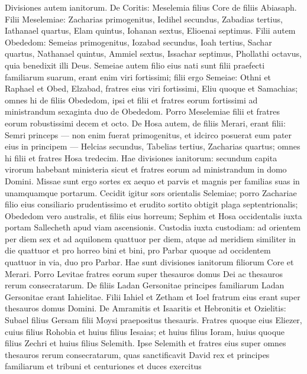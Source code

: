 \begin{biblechapter}  
\verse Divisiones autem ianitorum. De Coritis: Meselemia filius Core de filiis Abiasaph. 
\verse Filii Meselemiae: Zacharias primogenitus, Iedihel secundus, Zabadias tertius, Iathanael quartus,  
\verse Elam quintus, Iohanan sextus, Elioenai septimus. 
\verse Filii autem Obededom: Semeias primogenitus, Iozabad secundus, Ioah tertius, Sachar quartus, Nathanael quintus, 
\verse Ammiel sextus, Issachar septimus, Phollathi octavus, quia benedixit illi Deus. 
\verse Semeiae autem filio eius nati sunt filii praefecti familiarum suarum, erant enim viri fortissimi; 
\verse filii ergo Semeiae: Othni et Raphael et Obed, Elzabad, fratres eius viri fortissimi, Eliu quoque et Samachias; 
\verse omnes hi de filiis Obededom, ipsi et filii et fratres eorum fortissimi ad ministrandum sexaginta duo de Obededom. 
\verse Porro Meselemiae filii et fratres eorum robustissimi decem et octo. 
\verse De Hosa autem, de filiis Merari, erant filii: Semri princeps — non enim fuerat primogenitus, et idcirco posuerat eum pater eius in principem — 
\verse Helcias secundus, Tabelias tertius, Zacharias quartus; omnes hi filii et fratres Hosa tredecim. 
\verse Hae divisiones ianitorum: secundum capita virorum habebant ministeria sicut et fratres eorum ad ministrandum in domo Domini. 
\verse Missae sunt ergo sortes ex aequo et parvis et magnis per familias suas in unamquamque portarum. 
\verse Cecidit igitur sors orientalis Selemiae; porro Zachariae filio eius consiliario prudentissimo et erudito sortito obtigit plaga septentrionalis; 
\verse Obededom vero australis, et filiis eius horreum; 
\verse Sephim et Hosa occidentalis iuxta portam Sallecheth apud viam ascensionis. Custodia iuxta custodiam: 
\verse ad orientem per diem sex et ad aquilonem quattuor per diem, atque ad meridiem similiter in die quattuor et pro horreo bini et bini, 
\verse pro Parbar quoque ad occidentem quattuor in via, duo pro Parbar. 
\verse Hae sunt divisiones ianitorum filiorum Core et Merari. 
\verse Porro Levitae fratres eorum super thesauros domus Dei ac thesauros rerum consecratarum. 
\verse De filiis Ladan Gersonitae principes familiarum Ladan Gersonitae erant Iahielitae. 
\verse Filii Iahiel et Zetham et Ioel fratrum eius erant super thesauros domus Domini. 
\verse De Amramitis et Isaaritis et Hebronitis et Ozielitis: 
\verse Subael filius Gersam filii Moysi praepositus thesauris. 
\verse Fratres quoque eius Eliezer, cuius filius Rohobia et huius filius Iesaias; et huius filius Ioram, huius quoque filius Zechri et huius filius Selemith. 
\verse Ipse Selemith et fratres eius super omnes thesauros rerum consecratarum, quas sanctificavit David rex et principes familiarum et tribuni et centuriones et duces exercitus 

\end{biblechapter}
